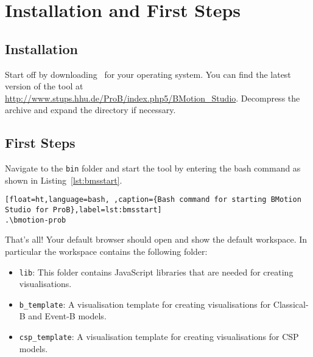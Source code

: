\section{Installation and First Steps}
\label{tutorial_02}

\subsection{Installation}

Start off by downloading \bms~for your operating system. 
You can find the latest version of the tool at \url{http://www.stups.hhu.de/ProB/index.php5/BMotion_Studio}.
Decompress the archive and expand the directory if necessary. 


\subsection{First Steps}

Navigate to the \texttt{bin} folder and start the tool by entering the bash command as shown in Listing~\ref{lst:bmsstart}.

\begin{lstlisting}[float=ht,language=bash, ,caption={Bash command for starting BMotion Studio for ProB},label=lst:bmsstart]
.\bmotion-prob
\end{lstlisting}


That's all! 
Your default browser should open and show the default workspace.
In particular the workspace contains the following folder:

\begin{itemize}
\item \texttt{lib}: This folder contains JavaScript libraries that are needed for creating visualisations.
\item \texttt{b\_template}: A visualisation template for creating visualisations for Classical-B and Event-B models.
\item \texttt{csp\_template}: A visualisation template for creating visualisations for CSP models.
\end{itemize}






